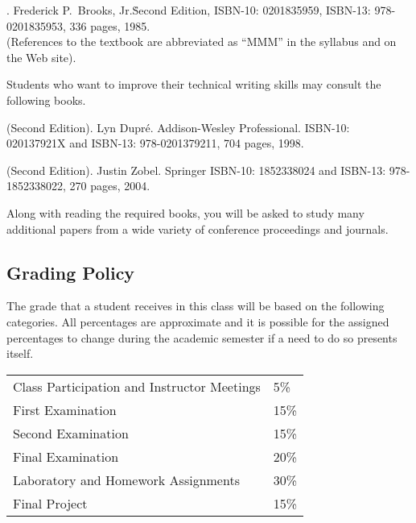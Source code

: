 . Frederick P.\ Brooks, Jr.\.
Second Edition, ISBN-10: 0201835959, ISBN-13: 978-0201835953, 336 pages, 1985. \\
(References to the textbook are abbreviated as ``MMM'' in the syllabus and on the Web site).

\noindent
Students who want to improve their technical writing skills may consult the following books.

(Second Edition). Lyn Dupr\'e.  Addison-Wesley Professional.
ISBN-10: 020137921X and ISBN-13: 978-0201379211, 704 pages, 1998.

 (Second Edition).
Justin Zobel.  Springer
ISBN-10: 1852338024 and ISBN-13: 978-1852338022, 270 pages, 2004.

Along with reading the required books, you will be asked to study many
additional papers from a wide variety of conference proceedings and
journals.

\subsection*{Grading Policy}


The grade that a student receives in this class will be based on the
following categories. All percentages are approximate and it is possible
for the assigned percentages to change during the academic semester if a
need to do so presents itself. 

\begin{center}
\begin{tabular}{ll}
Class Participation and Instructor Meetings & 5\% \\
First Examination & 15\% \\
Second Examination & 15\% \\
Final Examination & 20\% \\
Laboratory and Homework Assignments & 30\% \\
Final Project & 15\%
\end{tabular}
\end{center}

